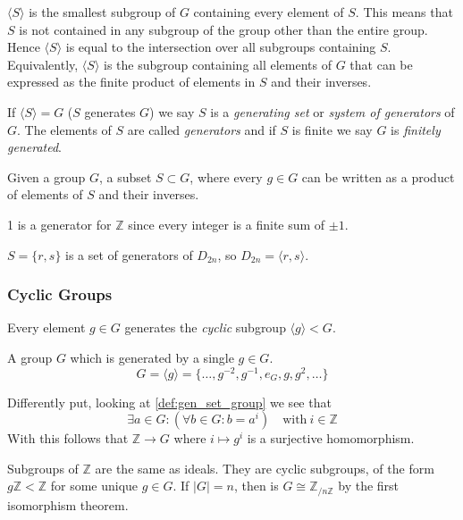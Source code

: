 \(\langle S \rangle\) is the smallest subgroup of \(G\) containing every element of \(S\).
This means that \(S\) is not contained in any subgroup of the group other than the entire group.
Hence \(\langle S \rangle\) is equal to the intersection over all subgroups containing \(S\).
Equivalently, \(\langle S \rangle\) is the subgroup containing all elements of \(G\) that can be expressed as the finite product of elements in \(S\) and their inverses.

If \(\langle S \rangle = G\) (\(S\) generates \(G\)) we say \(S\) is a \emph{generating set} or \emph{system of generators} of \(G\).
The elements of \(S\) are called \emph{generators} and if \(S\) is finite we say \(G\) is \emph{finitely generated}.

\begin{definition}\label{def:gen_set_group}
   Given a group \(G\), a subset \(S \subset G\), where every \(g \in G\) can be written as a product of elements of \(S\) and their inverses.
\end{definition}
\begin{example}
   1 is a generator for \(\mathbb{Z}\) since every integer is a finite sum of \(\pm 1\).
\end{example}
\begin{example}
   \(S = \{r, s\}\) is a set of generators of \(D_{2n}\), so \(D_{2n} = \langle r, s \rangle\).
\end{example}

\subsubsection{Cyclic Groups}
Every element \(g \in G\) generates the \emph{cyclic} subgroup \(\langle g \rangle < G\).

\begin{definition}\label{def:cyclic_group}
   A group \(G\) which is generated by a single \(g \in G\).
   \[G = \langle g \rangle = \{\ldots, g^{-2}, g^{-1}, e_G, g, g^2, \ldots\}\]
\end{definition}
\begin{remark}
   Differently put, looking at \cref{def:gen_set_group} we see that
   \[\exists a \in G: (\forall b \in G: b = a^i) \quad\text{with}~i \in \mathbb{Z}\]
   With this follows that \(\mathbb{Z} \to G\) where \(i \mapsto g^i\) is a surjective homomorphism.
\end{remark}
\begin{example}
   Subgroups of \(\mathbb{Z}\) are the same as ideals.
   They are cyclic subgroups, of the form \(g\mathbb{Z} < \mathbb{Z}\) for some unique \(g \in G\).
   If \(|G| = n\), then is \(G \cong \mathbb{Z}_{/n\mathbb{Z}}\) by the first isomorphism theorem.
\end{example}

